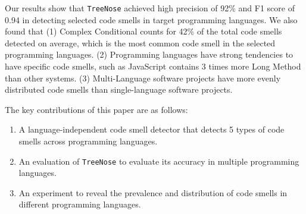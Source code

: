 
Our results show that \texttt{TreeNose} achieved high precision of 92\% and F1
score of 0.94 in detecting selected code smells in target programming languages.
We also found that (1) Complex Conditional counts for 42\% of the total code
smells detected on average, which is the most common code smell in the selected
programming languages. (2) Programming languages have strong tendencies to have
specific code smells, such as JavaScript contains 3 times more Long Method than
other systems. (3) Multi-Language software projects have more evenly distributed
code smells than single-language software projects.


The key contributions of this paper are as follows:

\begin{enumerate}
    \item A language-independent code smell detector that detects 5 types of
        code smells across programming languages.
    \item An evaluation of \texttt{TreeNose} to evaluate its accuracy in
        multiple programming languages.
    \item An experiment to reveal the prevalence and distribution of code smells
        in different programming languages.
\end{enumerate}

